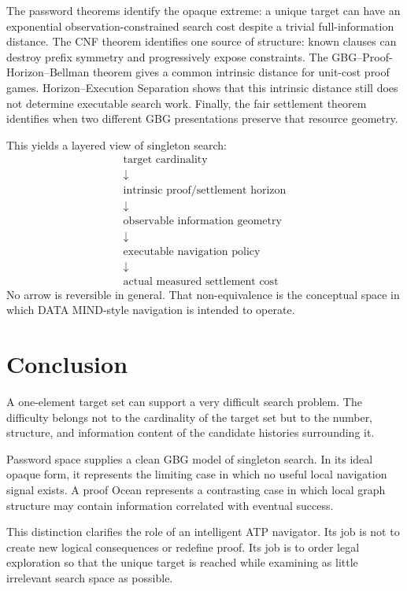 \documentclass[11pt]{article}
\begin{document}
The password theorems identify the opaque extreme: a unique target can have an
exponential observation-constrained search cost despite a trivial
full-information distance.  The CNF theorem identifies one source of structure:
known clauses can destroy prefix symmetry and progressively expose constraints.
The GBG--Proof-Horizon--Bellman theorem gives a common intrinsic distance for
unit-cost proof games.  Horizon--Execution Separation shows that this intrinsic
distance still does not determine executable search work.  Finally, the fair
settlement theorem identifies when two different GBG presentations preserve
that resource geometry.

This yields a layered view of singleton search:
\[
\boxed{
\begin{array}{c}
\text{target cardinality}\\[2pt]
\downarrow\\[-1pt]
\text{intrinsic proof/settlement horizon}\\[2pt]
\downarrow\\[-1pt]
\text{observable information geometry}\\[2pt]
\downarrow\\[-1pt]
\text{executable navigation policy}\\[2pt]
\downarrow\\[-1pt]
\text{actual measured settlement cost}
\end{array}}
\]
No arrow is reversible in general.  That non-equivalence is the conceptual
space in which DATA MIND-style navigation is intended to operate.

\section{Conclusion}

A one-element target set can support a very difficult search problem. The
difficulty belongs not to the cardinality of the target set but to the number,
structure, and information content of the candidate histories surrounding it.

Password space supplies a clean GBG model of singleton search. In its ideal
opaque form, it represents the limiting case in which no useful local
navigation signal exists. A proof Ocean represents a contrasting case in
which local graph structure may contain information correlated with eventual
success.

This distinction clarifies the role of an intelligent ATP navigator. Its job
is not to create new logical consequences or redefine proof. Its job is to
order legal exploration so that the unique target is reached while examining
as little irrelevant search space as possible.
\end{document}
